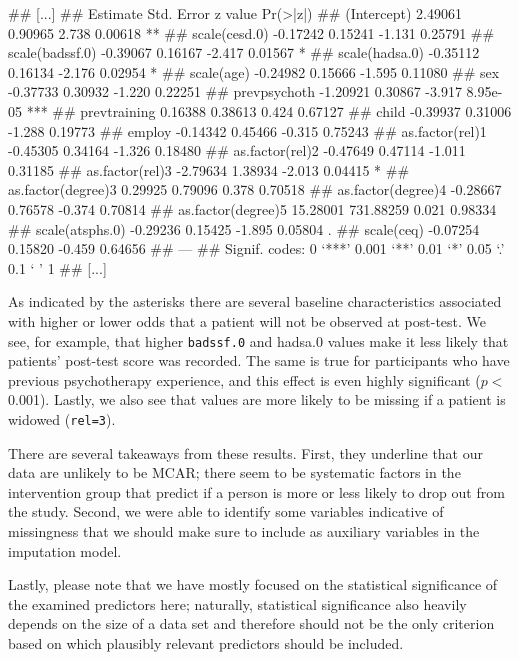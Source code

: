 \begin{example}
## [...]
##                     Estimate Std. Error z value Pr(>|z|)    
## (Intercept)          2.49061    0.90965   2.738  0.00618 ** 
## scale(cesd.0)       -0.17242    0.15241  -1.131  0.25791    
## scale(badssf.0)     -0.39067    0.16167  -2.417  0.01567 *  
## scale(hadsa.0)      -0.35112    0.16134  -2.176  0.02954 *  
## scale(age)          -0.24982    0.15666  -1.595  0.11080    
## sex                 -0.37733    0.30932  -1.220  0.22251    
## prevpsychoth        -1.20921    0.30867  -3.917 8.95e-05 ***
## prevtraining         0.16388    0.38613   0.424  0.67127    
## child               -0.39937    0.31006  -1.288  0.19773    
## employ              -0.14342    0.45466  -0.315  0.75243    
## as.factor(rel)1     -0.45305    0.34164  -1.326  0.18480    
## as.factor(rel)2     -0.47649    0.47114  -1.011  0.31185    
## as.factor(rel)3     -2.79634    1.38934  -2.013  0.04415 *  
## as.factor(degree)3   0.29925    0.79096   0.378  0.70518    
## as.factor(degree)4  -0.28667    0.76578  -0.374  0.70814    
## as.factor(degree)5  15.28001  731.88259   0.021  0.98334    
## scale(atsphs.0)     -0.29236    0.15425  -1.895  0.05804 .  
## scale(ceq)          -0.07254    0.15820  -0.459  0.64656   
## ---
## Signif. codes:  0 ‘***’ 0.001 ‘**’ 0.01 ‘*’ 0.05 ‘.’ 0.1 ‘ ’ 1
## [...]
\end{example}

As indicated by the asterisks there are several baseline characteristics associated with higher or lower odds that a patient will not be observed at post-test. We see, for example, that higher \texttt{badssf.0} and \textsf{hadsa.0} values make it less likely that patients' post-test score was recorded. The same is true for participants who have previous psychotherapy experience, and this effect is even highly significant ($p<$0.001). Lastly, we also see that values are more likely to be missing if a patient is widowed (\texttt{rel=3}).

There are several takeaways from these results. First, they underline that our data are unlikely to be MCAR; there seem to be systematic factors in the intervention group that predict if a person is more or less likely to drop out from the study. Second, we were able to identify some variables indicative of missingness that we should make sure to include as auxiliary variables in the imputation model. 

Lastly, please note that we have mostly focused on the statistical significance of the examined predictors here; naturally, statistical significance also heavily depends on the size of a data set and therefore should not be the only criterion based on which plausibly relevant predictors should be included.

